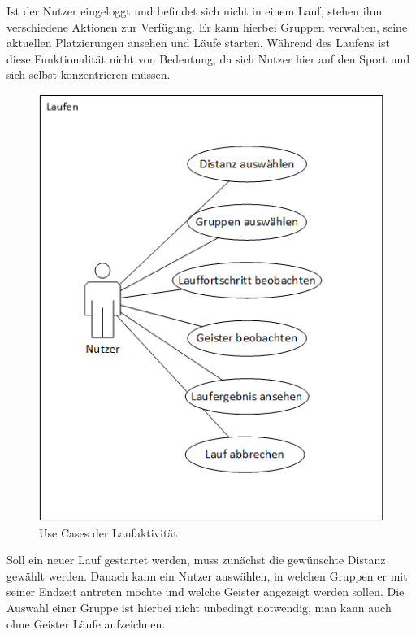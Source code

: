 Ist der Nutzer eingeloggt und befindet sich nicht in einem Lauf, stehen ihm verschiedene Aktionen zur Verfügung. Er kann hierbei Gruppen verwalten, seine aktuellen Platzierungen ansehen und Läufe starten. Während des Laufens ist diese Funktionalität nicht von Bedeutung, da sich Nutzer hier auf den Sport und sich selbst konzentrieren müssen.
\begin {figure}[!hb]\label{fig:usecase_run}
\centering
\includegraphics[width=\textwidth]{abb/usecase_run}
\caption{Use Cases der Laufaktivität}
\end{figure}
Soll ein neuer Lauf gestartet werden, muss zunächst die gewünschte Distanz gewählt werden. Danach kann ein Nutzer auswählen, in welchen Gruppen er mit seiner Endzeit antreten möchte und welche Geister angezeigt werden sollen. Die Auswahl einer Gruppe ist hierbei nicht unbedingt notwendig, man kann auch ohne Geister Läufe 
aufzeichnen.
